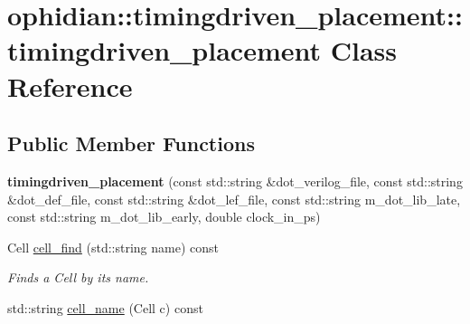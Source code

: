 \hypertarget{classophidian_1_1timingdriven__placement_1_1timingdriven__placement}{\section{ophidian\-:\-:timingdriven\-\_\-placement\-:\-:timingdriven\-\_\-placement Class Reference}
\label{classophidian_1_1timingdriven__placement_1_1timingdriven__placement}
}
\subsection*{Public Member Functions}
\begin{DoxyCompactItemize}
\item 
\hypertarget{classophidian_1_1timingdriven__placement_1_1timingdriven__placement_a40d265730b04f7a9cbb84d5e31a832f7}{{\bfseries timingdriven\-\_\-placement} (const std\-::string \&dot\-\_\-verilog\-\_\-file, const std\-::string \&dot\-\_\-def\-\_\-file, const std\-::string \&dot\-\_\-lef\-\_\-file, const std\-::string m\-\_\-dot\-\_\-lib\-\_\-late, const std\-::string m\-\_\-dot\-\_\-lib\-\_\-early, double clock\-\_\-in\-\_\-ps)}\label{classophidian_1_1timingdriven__placement_1_1timingdriven__placement_a40d265730b04f7a9cbb84d5e31a832f7}

\item 
\hypertarget{classophidian_1_1timingdriven__placement_1_1timingdriven__placement_af1c4f2864c164e6d4fdcec3da391bce1}{Cell \hyperlink{classophidian_1_1timingdriven__placement_1_1timingdriven__placement_af1c4f2864c164e6d4fdcec3da391bce1}{cell\-\_\-find} (std\-::string name) const }\label{classophidian_1_1timingdriven__placement_1_1timingdriven__placement_af1c4f2864c164e6d4fdcec3da391bce1}

\begin{DoxyCompactList}\small\item\em Finds a Cell by its name. \end{DoxyCompactList}\item 
\hypertarget{classophidian_1_1timingdriven__placement_1_1timingdriven__placement_afd0781cae7f35b46803228bd8c037963}{std\-::string \hyperlink{classophidian_1_1timingdriven__placement_1_1timingdriven__placement_afd0781cae7f35b46803228bd8c037963}{cell\-\_\-name} (Cell c) const }\label{classophidian_1_1timingdriven__placement_1_1timingdriven__placement_afd0781cae7f35b46803228bd8c037963}


\end{DoxyCompactItemize}
